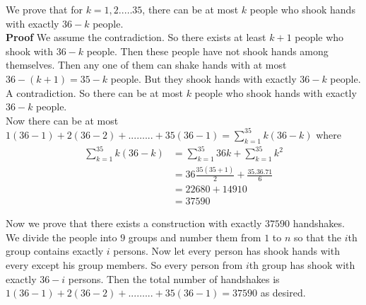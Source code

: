 \documentclass{article}
\begin{document}
		We prove that for $k=1,2..\dots 35$, there can be at most $k$ people who shook hands with exactly $36-k$ people.\\
\textbf{Proof} We assume the contradiction. So there exists at least $k+1$ people who shook with $36-k$ people. Then these people have not shook hands among themselves. Then any one of them can shake hands with at most $36-(k+1)=35-k $ people. But they shook hands with exactly $36-k$ people. A contradiction. So there can be at most $k$ people who shook hands with exactly $36-k$ people.\\

\bigskip
Now there can be at most $1(36-1)+2(36-2)+...\dots... +35(36-1)=\sum_{k=1}^{35}k(36-k)$
where
\begin{eqnarray*}
\sum_{k=1}^{35}k(36-k) & = \sum_{k=1}^{35}36k+\sum_{k=1}^{35}k^2\\
                       & = 36\frac{35(35+1)}{2}+\frac{35.36.71}{6}\\
                       & = 22680+14910\\
                       & = 37590
\end{eqnarray*}

Now we prove that there exists a construction with exactly $37590$ handshakes.\\
We divide the people into $9$ groups and number them from $1$ to $n$ so that the $i$th group contains exactly $i$ persons. Now let every person has shook hands with every except his group members. So every person from $i$th group has shook with exactly $36-i$ persons. Then the total number of handshakes is $1(36-1)+2(36-2)+...\dots... +35(36-1)=37590$ as desired.
\end{document}
